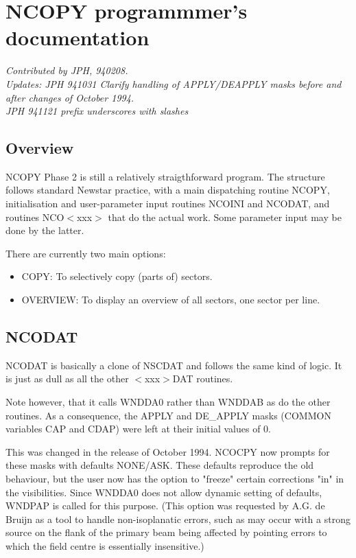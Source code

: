 \chapter{NCOPY programmmer's documentation}

{\em Contributed by JPH, 940208. \\
Updates:
	JPH 941031      Clarify handling of APPLY/DEAPPLY masks before and
after changes of October 1994.
\\      JPH 941121      prefix underscores with slashes
}
\newcommand{\bi}{ \begin{itemize} }
\newcommand{\ei}{ \end{itemize} }

\tableofcontents


\section{ Overview}

	NCOPY Phase 2 is still a relatively straigthforward program. The
structure follows standard Newstar practice, with a main dispatching routine
NCOPY, initialisation and user-parameter input routines NCOINI and NCODAT, and
routines NCO$<$xxx$>$ that do the actual work. Some parameter input may be done
by the latter.

	There are currently two main options:
\bi
\item   COPY: To selectively copy (parts of) sectors.

\item   OVERVIEW: To display an overview of all sectors, one sector per line.
\ei

\section{ NCODAT }

	NCODAT is basically a clone of NSCDAT and follows the same kind of
logic. It is just as dull as all the other $<$xxx$>$DAT routines.

	Note however, that it calls WNDDA0 rather than WNDDAB as do the other
routines. As a consequence, the APPLY and DE\_APPLY masks (COMMON variables CAP
and CDAP) were left at their initial values of 0.

	This was changed in the release of October 1994. NCOCPY now prompts for
these masks with defaults NONE/ASK. These defaults reproduce the old behaviour,
but the user now has the option to "freeze" certain corrections "in" in the
visibilities. Since WNDDA0 does not allow dynamic setting of defaults, WNDPAP
is called for this purpose. (This option was requested by A.G. de Bruijn as a
tool to handle non-isoplanatic errors, such as may occur with a strong source
on the flank of the primary beam being affected by pointing errors to which the
field centre is essentially insensitive.)


